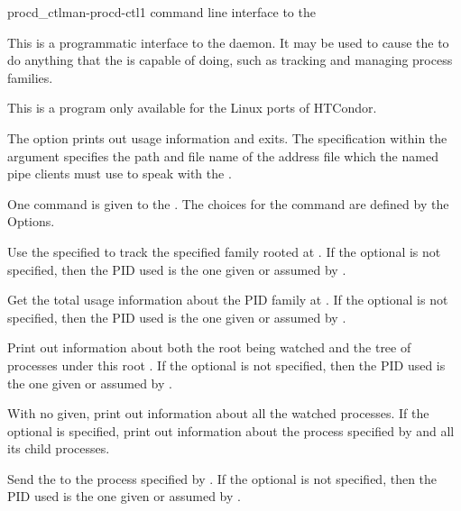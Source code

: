 \begin{ManPage}{procd\_ctl}{man-procd-ctl}{}{1}
{command line interface to the }

\Synopsis {} 


\Description 

This is a programmatic interface to the  daemon. 
It may be used to 
cause the  to do anything that the 
is capable of doing,
such as tracking and managing process families.

This is a program only available for the Linux ports of HTCondor.

The  option prints out usage information and exits.
The   specification within the  argument
specifies the path and file name of the address file
which the named pipe clients must use to speak with the .

One command is given to the . 
The choices for the command are defined by the Options. 

\begin{Options}

  {Use the specified  to track the specified family rooted at 
  .  
  If the optional  is not specified, 
  then the PID used is the one given or assumed by .}

  {Get the total usage information about the PID family at .
  If the optional  is not specified, 
  then the PID used is the one given or assumed by .}

  {Print out information about both the root  being watched 
  and the tree of processes under this root .
  If the optional  is not specified, 
  then the PID used is the one given or assumed by .}

  {With no  given, print out information about all 
  the watched processes.  
  If the optional  is specified,
  print out information about the process specified by  
  and all its child processes.}

  {Send the  to the process specified by .
  If the optional  is not specified, 
  then the PID used is the one given or assumed by .}


\end{Options}
\end{ManPage}
